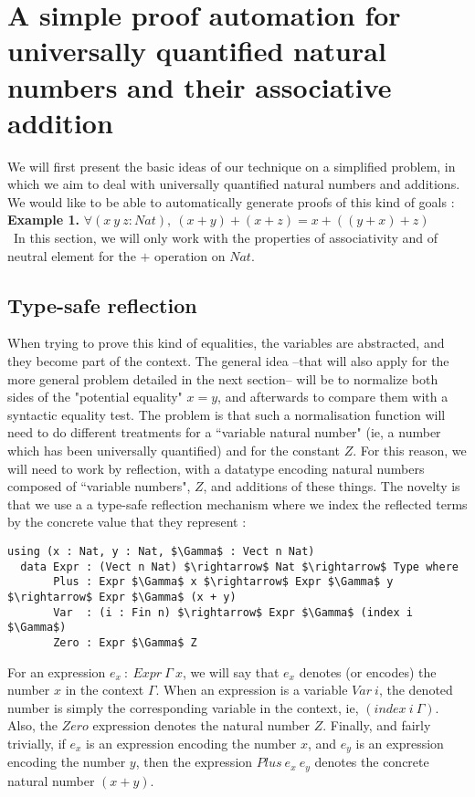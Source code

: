 \section{A simple proof automation for universally quantified natural numbers and their associative addition}
\label{sect:aSimpleProofAutomation}


We will first present the basic ideas of our technique on a simplified problem, in which we aim to deal with universally quantified natural numbers and additions. We would like to be able to automatically generate proofs of this kind of goals :
\\
\textbf{Example 1.} $\forall (x\ y\ z:Nat),\ (x + y) + (x + z) = x + ((y + x) + z)$  \\
\
In this section, we will only work with the properties of associativity and of neutral element for the $+$ operation on $Nat$.

\subsection{Type-safe reflection}


When trying to prove this kind of equalities, the variables are abstracted, and they become part of the context. The general idea --that will also apply for the more general problem detailed in the next section-- will be to normalize both sides of the "potential equality" $x=y$, and afterwards to compare them with a syntactic equality test. The problem is that such a normalisation function will need to do different treatments for a ``variable natural number" (ie, a number which has been universally quantified) and for the constant $Z$. For this reason, we will need to work by reflection, with a datatype encoding natural numbers composed of ``variable numbers", $Z$, and additions of these things. The novelty is that we use a a type-safe reflection mechanism where we index the reflected terms by the concrete value that they represent : 

\begin{lstlisting}
using (x : Nat, y : Nat, $\Gamma$ : Vect n Nat)
  data Expr : (Vect n Nat) $\rightarrow$ Nat $\rightarrow$ Type where
       Plus : Expr $\Gamma$ x $\rightarrow$ Expr $\Gamma$ y $\rightarrow$ Expr $\Gamma$ (x + y)
       Var  : (i : Fin n) $\rightarrow$ Expr $\Gamma$ (index i $\Gamma$)
       Zero : Expr $\Gamma$ Z
\end{lstlisting}

For an expression $e_x\ :\ Expr\ \Gamma\ x$, we will say that $e_x$ denotes (or encodes) the number $x$ in the context $\Gamma$.
When an expression is a variable $Var\ i$, the denoted number is simply the corresponding variable in the context, ie, $(index\ i\ \Gamma)$.
Also, the $Zero$ expression denotes the natural number $Z$.
Finally, and fairly trivially, if $e_x$ is an expression encoding the number $x$, and $e_y$ is an expression encoding the number $y$, then the expression $Plus\ e_x\ e_y$ denotes the concrete natural number $(x + y)$.

